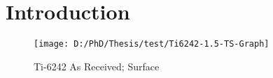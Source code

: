 \chapter{Introduction}

\begin{figure}[H]
    \centering
        \texttt{[image: D:/PhD/Thesis/test/Ti6242-1.5-TS-Graph]}
        \caption{Ti-6242 As Received; Surface}
    \label{fig:EDM-Cut}
\end{figure}
